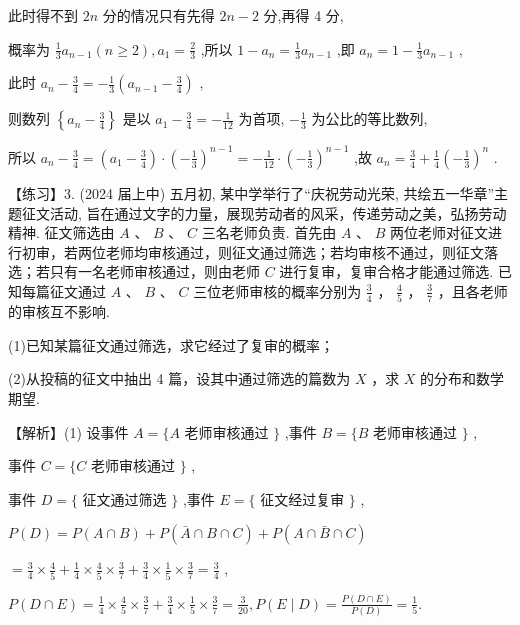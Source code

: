 \documentclass[10pt]{article}
\begin{document}
此时得不到 \({2n}\) 分的情况只有先得 \({2n} - 2\) 分,再得 4 分,

概率为 \(\frac{1}{3}{a}_{n - 1}\left( {n \geq  2}\right) ,{a}_{1} = \frac{2}{3}\) ,所以 \(1 - {a}_{n} = \frac{1}{3}{a}_{n - 1}\) ,即 \({a}_{n} = 1 - \frac{1}{3}{a}_{n - 1}\) ,

此时 \({a}_{n} - \frac{3}{4} =  - \frac{1}{3}\left( {{a}_{n - 1} - \frac{3}{4}}\right)\) ,

则数列 \(\left\{  {{a}_{n} - \frac{3}{4}}\right\}\) 是以 \({a}_{1} - \frac{3}{4} =  - \frac{1}{12}\) 为首项, \(- \frac{1}{3}\) 为公比的等比数列,

所以 \({a}_{n} - \frac{3}{4} = \left( {{a}_{1} - \frac{3}{4}}\right)  \cdot  {\left( -\frac{1}{3}\right) }^{n - 1} =  - \frac{1}{12} \cdot  {\left( -\frac{1}{3}\right) }^{n - 1}\) ,故 \({a}_{n} = \frac{3}{4} + \frac{1}{4}{\left( -\frac{1}{3}\right) }^{n}\) .

【练习】3. (2024 届上中) 五月初, 某中学举行了“庆祝劳动光荣, 共绘五一华章”主题征文活动, 旨在通过文字的力量，展现劳动者的风采，传递劳动之美，弘扬劳动精神. 征文筛选由 \(A\) 、 \(B\) 、 \(C\) 三名老师负责. 首先由 \(A\) 、 \(B\) 两位老师对征文进行初审，若两位老师均审核通过，则征文通过筛选；若均审核不通过，则征文落选；若只有一名老师审核通过，则由老师 \(C\) 进行复审，复审合格才能通过筛选. 已知每篇征文通过 \(A\) 、 \(B\) 、 \(C\) 三位老师审核的概率分别为 \(\frac{3}{4}\) ， \(\frac{4}{5}\) ， \(\frac{3}{7}\) ，且各老师的审核互不影响.

(1)已知某篇征文通过筛选，求它经过了复审的概率；

(2)从投稿的征文中抽出 4 篇，设其中通过筛选的篇数为 \(X\) ，求 \(X\) 的分布和数学期望.

【解析】(1) 设事件 \(A = \{ A\) 老师审核通过 \(\}\) ,事件 \(B = \{ B\) 老师审核通过 \(\}\) ,

事件 \(C = \{ C\) 老师审核通过 \(\}\) ,

事件 \(D = \{\) 征文通过筛选 \(\}\) ,事件 \(E = \{\) 征文经过复审 \(\}\) ,

\(P\left( D\right)  = P\left( {A \cap  B}\right)  + P\left( {\bar{A} \cap  B \cap  C}\right)  + P\left( {A \cap  \bar{B} \cap  C}\right)\)

\(= \frac{3}{4} \times  \frac{4}{5} + \frac{1}{4} \times  \frac{4}{5} \times  \frac{3}{7} + \frac{3}{4} \times  \frac{1}{5} \times  \frac{3}{7} = \frac{3}{4}\) ,

\(P\left( {D \cap  E}\right)  = \frac{1}{4} \times  \frac{4}{5} \times  \frac{3}{7} + \frac{3}{4} \times  \frac{1}{5} \times  \frac{3}{7} = \frac{3}{20},P\left( {E \mid  D}\right)  = \frac{P\left( {D \cap  E}\right) }{P\left( D\right) } = \frac{1}{5}.\)
\end{document}
